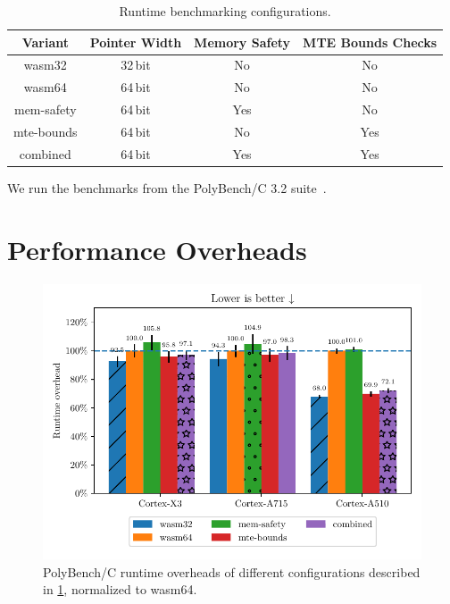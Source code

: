 \begin{table}[ht]
    \centering
    \small
    \caption{Runtime benchmarking configurations.}
    \label{tab:benchmark-variants}
    \begin{tabular}{c || c|c|c}
        \textbf{Variant} & \textbf{Pointer Width} & \textbf{Memory Safety} & \textbf{MTE Bounds Checks} \\
        \hline
        wasm32           & 32\,bit                & No                     & No                         \\
        wasm64           & 64\,bit                & No                     & No                         \\
        mem-safety       & 64\,bit                & Yes                    & No                         \\
        mte-bounds       & 64\,bit                & No                     & Yes                        \\
        combined         & 64\,bit                & Yes                    & Yes                        \\
    \end{tabular}
\end{table}

\noindent
We run the benchmarks from the PolyBench/C 3.2 suite~\cite{polybenchc}.


\section{Performance Overheads}
\label{sec:performance-overheads}

\begin{figure}[ht]
    \centering
    \includegraphics{plots/runtimes-all}
    \caption{PolyBench/C runtime overheads of different configurations described in \cref{tab:benchmark-variants}, normalized to wasm64.}
    \label{fig:runtime-overheads-combined}
\end{figure}

